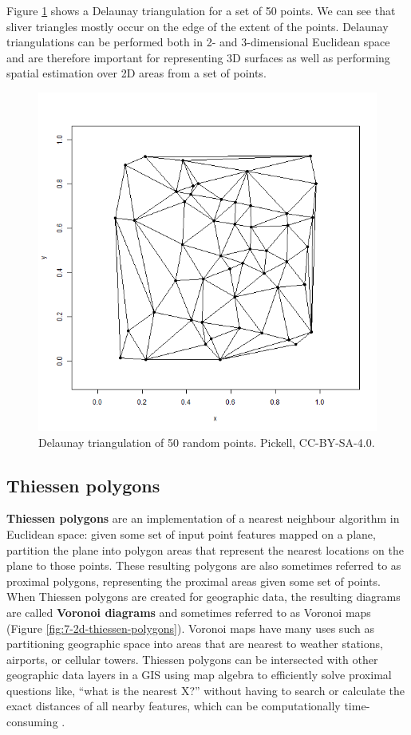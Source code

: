 \documentclass[
]{book}
\begin{document}
Figure \ref{fig:7-delaunay-triangulation} shows a Delaunay triangulation for a set of 50 points. We can see that sliver triangles mostly occur on the edge of the extent of the points. Delaunay triangulations can be performed both in 2- and 3-dimensional Euclidean space and are therefore important for representing 3D surfaces as well as performing spatial estimation over 2D areas from a set of points.

\begin{figure}
\includegraphics[width=0.75\linewidth]{images/07-delaunay-triangulation} \caption{Delaunay triangulation of 50 random points. Pickell, CC-BY-SA-4.0.}\label{fig:7-delaunay-triangulation}
\end{figure}

\subsection{Thiessen polygons}\label{thiessen-polygons}

\textbf{Thiessen polygons} are an implementation of a nearest neighbour algorithm in Euclidean space: given some set of input point features mapped on a plane, partition the plane into polygon areas that represent the nearest locations on the plane to those points. These resulting polygons are also sometimes referred to as proximal polygons, representing the proximal areas given some set of points. When Thiessen polygons are created for geographic data, the resulting diagrams are called \textbf{Voronoi diagrams} and sometimes referred to as Voronoi maps (Figure \ref{fig:7-2d-thiessen-polygons}). Voronoi maps have many uses such as partitioning geographic space into areas that are nearest to weather stations, airports, or cellular towers. Thiessen polygons can be intersected with other geographic data layers in a GIS using map algebra to efficiently solve proximal questions like, ``what is the nearest X?'' without having to search or calculate the exact distances of all nearby features, which can be computationally time-consuming \citep{okabe_nearest_1994}.
\end{document}
